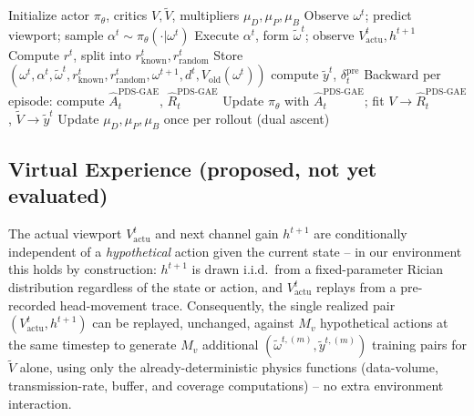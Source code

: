 \documentclass[conference]{IEEEtran}
\begin{document}
\begin{algorithm}[t]
\caption{PPO + Post-Decision State (PDS-GAE)}
\label{alg:pdsgae}
\begin{algorithmic}[1]
\State Initialize actor $\pi_\theta$, critics $V,\tilde V$, multipliers $\mu_D,\mu_P,\mu_B$
    \State Observe $\omega^t$; predict viewport; sample $\alpha^t \sim \pi_\theta(\cdot|\omega^t)$
    \State Execute $\alpha^t$, form $\tilde\omega^t$; observe $V^t_{\text{actu}}, h^{t+1}$
    \State Compute $r^t$, split into $r^t_{\text{known}}, r^t_{\text{random}}$
    \State Store $(\omega^t,\alpha^t,\tilde\omega^t,r^t_{\text{known}},r^t_{\text{random}},\omega^{t+1},d^t,V_{\text{old}}(\omega^t))$
  \EndFor
   compute $\tilde y^t$, $\delta_t^{\text{pre}}$ \EndFor
  \State Backward per episode: compute $\hat A_t^{\text{PDS-GAE}}$, $\hat R_t^{\text{PDS-GAE}}$
  \State Update $\pi_\theta$ with $\hat A_t^{\text{PDS-GAE}}$; fit $V \to \hat R_t^{\text{PDS-GAE}}$, $\tilde V \to \tilde y^t$
  \State Update $\mu_D,\mu_P,\mu_B$ once per rollout (dual ascent)
\EndFor
\end{algorithmic}
\end{algorithm}

\subsection{Virtual Experience (proposed, not yet evaluated)}
\label{sec:ve}

The actual viewport $V^t_{\text{actu}}$ and next channel gain $h^{t+1}$ are conditionally
independent of a \emph{hypothetical} action given the current state -- in our
environment this holds by construction: $h^{t+1}$ is drawn i.i.d.\ from a fixed-parameter
Rician distribution regardless of the state or action, and $V^t_{\text{actu}}$ replays
from a pre-recorded head-movement trace. Consequently, the single realized pair
$(V^t_{\text{actu}}, h^{t+1})$ can be replayed, unchanged, against $M_v$ hypothetical
actions at the same timestep to generate $M_v$ additional $(\tilde\omega^{t,(m)}, \tilde
y^{t,(m)})$ training pairs for $\tilde V$ alone, using only the already-deterministic
physics functions (data-volume, transmission-rate, buffer, and coverage computations) --
no extra environment interaction.
\end{document}
